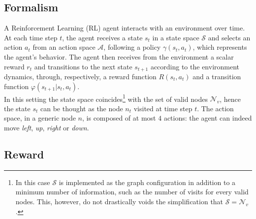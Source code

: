 \documentclass[a4paper]{article}
\begin{document}
\subsection{Formalism}
A Reinforcement Learning (RL) agent interacts with an environment over time. At each time step $t$, the agent receives a state $s_t$ in a state space $\mathcal{S}$ and selects an action $a_t$ from an action space $\mathcal{A}$, following a policy $\gamma(s_t, a_t)$, which represents the agent’s behavior. The agent then receives from the environment a scalar reward $r_t$ and transitions to the next state $s_{t+1}$ according to the environment dynamics, through, respectively, a reward function $R(s_t,a_t)$ and a transition function $\varphi(s_{t+1}|s_t,a_t)$. \\
In this setting the state space coincides\footnote{In this case $\mathcal{S}$ is implemented as the graph configuration in addition to a minimum number of information, such as the number of visits for every valid nodes. This, however, do not drastically voids the simplification that $\mathcal{S} = \mathcal{N}_v$.} with the set of valid nodes $\mathcal{N}_v$, hence the state $s_t$ can be thought as the node $n_t$ visited at time step $t$. The action space, in a generic node $n$, is composed of at most $4$ actions: the agent can indeed move \textit{left}, \textit{up}, \textit{right} or \textit{down}.

\subsection{Reward}
\end{document}
